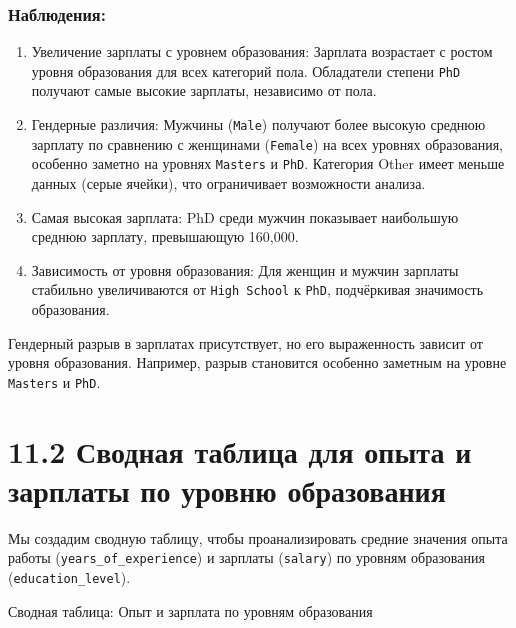 \documentclass[
]{article}
\begin{document}
\subsubsection{Наблюдения:}\label{ux43dux430ux431ux43bux44eux434ux435ux43dux438ux44f-14}

\begin{enumerate}
\def\labelenumi{\arabic{enumi}.}
\item
  Увеличение зарплаты с уровнем образования: Зарплата возрастает с
  ростом уровня образования для всех категорий пола. Обладатели степени
  \texttt{PhD} получают самые высокие зарплаты, независимо от пола.
\item
  Гендерные различия: Мужчины (\texttt{Male}) получают более высокую
  среднюю зарплату по сравнению с женщинами (\texttt{Female}) на всех
  уровнях образования, особенно заметно на уровнях
  \texttt{Master\textquotesingle{}s} и \texttt{PhD}. Категория Other
  имеет меньше данных (серые ячейки), что ограничивает возможности
  анализа.
\item
  Самая высокая зарплата: PhD среди мужчин показывает наибольшую среднюю
  зарплату, превышающую 160,000.
\item
  Зависимость от уровня образования: Для женщин и мужчин зарплаты
  стабильно увеличиваются от \texttt{High\ School} к \texttt{PhD},
  подчёркивая значимость образования.
\end{enumerate}

Гендерный разрыв в зарплатах присутствует, но его выраженность зависит
от уровня образования. Например, разрыв становится особенно заметным на
уровне \texttt{Master\textquotesingle{}s} и \texttt{PhD}.

\section{11.2 Сводная таблица для опыта и зарплаты по уровню
образования}\label{ux441ux432ux43eux434ux43dux430ux44f-ux442ux430ux431ux43bux438ux446ux430-ux434ux43bux44f-ux43eux43fux44bux442ux430-ux438-ux437ux430ux440ux43fux43bux430ux442ux44b-ux43fux43e-ux443ux440ux43eux432ux43dux44e-ux43eux431ux440ux430ux437ux43eux432ux430ux43dux438ux44f}

Мы создадим сводную таблицу, чтобы проанализировать средние значения
опыта работы (\texttt{years\_of\_experience}) и зарплаты
(\texttt{salary}) по уровням образования (\texttt{education\_level}).

Сводная таблица: Опыт и зарплата по уровням образования
\end{document}
